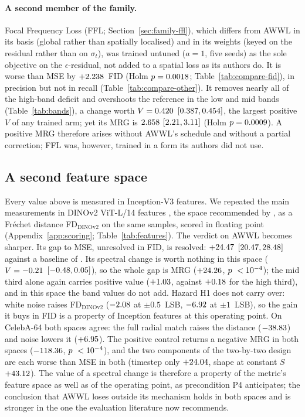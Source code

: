 \paragraph{A second member of the family.}
\label{sec:second-member}
Focal Frequency Loss (FFL; Section~\ref{sec:family-ffl}), which differs from
AWWL in its basis (global rather than spatially localised) and in its weights
(keyed on the residual rather than on $\sigma_t$), was trained untuned
($a = 1$, five seeds) as the sole objective on the $\epsilon$-residual, not
added to a spatial loss as its authors do. It is worse than MSE by
$+2.238$~FID (Holm $p = 0.0018$; Table~\ref{tab:compare-fid}), in
precision but not in recall (Table~\ref{tab:compare-other}). It removes nearly all of the
high-band deficit and overshoots the reference in the low and mid bands
(Table~\ref{tab:bands}), a change worth $V = 0.420$
$[0.387, 0.454]$, the largest positive $V$ of any trained
arm; yet its MRG is $2.658$ $[2.21, 3.11]$ (Holm
$p = 0.0009$). A positive MRG therefore arises without AWWL's
schedule and without a partial correction; FFL was, however, trained in a
form its authors did not use.

\subsection{A second feature space}
\label{sec:worth-dino}
Every value above is measured in Inception-V3 features. We repeated the main
measurements in DINOv2 ViT-L/14 features \citep{oquab2024dinov2}, the space
recommended by \citet{stein2023exposing}, as a Fr\'echet distance
FD$_{\text{DINOv2}}$ on the same samples, scored in floating point
(Appendix~\ref{app:scoring}; Table~\ref{tab:features}). The verdict on AWWL
becomes sharper. Its gap to MSE, unresolved in FID, is resolved:
$+24.47$ $[20.47, 28.48]$ against a baseline of
\fddMSEmean. Its spectral change is worth nothing in this space
($V = -0.21$ $[-0.48, 0.05]$), so the whole gap
is MRG ($+24.26$, $p~<10^{-4}$); the mid third alone again carries
positive value ($+1.03$, against $+0.18$ for the high third),
and in this space the band values do not add. Hazard H1 does not carry over:
white noise raises FD$_{\text{DINOv2}}$ ($-2.08$ at $\pm0.5$~LSB,
$-6.92$ at $\pm1$~LSB), so the gain it buys in FID is a property of
Inception features at this operating point. On CelebA-64 both spaces agree:
the full radial match raises the distance ($-38.83$) and noise
lowers it ($+6.95$). The positive control returns a
negative MRG in both spaces ($-118.36$, $p~<10^{-4}$), and the
two components of the two-by-two design are each worse than MSE in both
(timestep only $+24.04$, shape at constant $S$ $+43.12$).
The value of a spectral change is therefore a property of the metric's
feature space as well as of the operating point, as precondition P4
anticipates; the conclusion that AWWL loses outside its mechanism holds in
both spaces and is stronger in the one the evaluation literature now
recommends.
